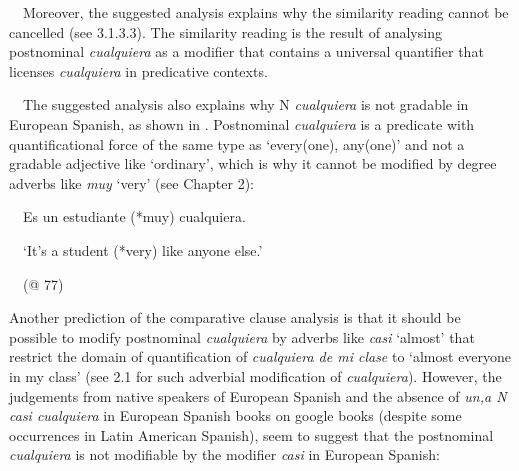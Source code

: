 \begin{styleStandard}
\ \ Moreover, the suggested analysis explains why the similarity reading cannot be cancelled (see 3.1.3.3). The similarity reading is the result of analysing postnominal \textit{cualquiera} as a modifier that contains a universal quantifier that licenses \textit{cualquiera} in predicative contexts. 
\end{styleStandard}

\begin{styleStandard}
\ \ The suggested analysis also explains why N \textit{cualquiera} is not gradable in European Spanish, as shown in . Postnominal \textit{cualquiera} is a predicate with quantificational force of the same type as ‘every(one), any(one)’ and not a gradable adjective like ‘ordinary’, which is why it cannot be modified by degree adverbs like \textit{muy} ‘very’ (see Chapter 2):
\end{styleStandard}

\begin{styleStandard}
\label{bkm:Ref58074686}\ \ Es un estudiante (*muy) cualquiera. \ \ 
\end{styleStandard}

\begin{styleStandard}
\ \ ‘It’s a student (*very) like anyone else.’
\end{styleStandard}

\begin{styleStandard}
\ \ (@ 77)
\end{styleStandard}

\begin{styleStandard}
Another prediction of the comparative clause analysis is that it should be possible to modify postnominal \textit{cualquiera }by adverbs like \textit{casi} ‘almost’ that restrict the domain of quantification of \textit{cualquiera de mi clase} to ‘almost everyone in my class’ (see 2.1 for such adverbial modification of \textit{cualquiera}). However, the judgements from native speakers of European Spanish and the absence of \textit{un,a N casi cualquiera} in European Spanish books on google books (despite some occurrences in Latin American Spanish), seem to suggest that the postnominal \textit{cualquiera} is not modifiable by the modifier \textit{casi} in European Spanish:
\end{styleStandard}

